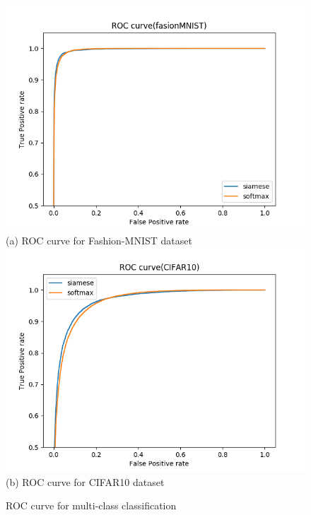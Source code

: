 \documentclass[a4paper,12pt]{article}
\begin{document}
\begin{figure}[ht!]
\centering
            \centering
            \includegraphics[scale=0.7]{fasion_multiroccurve.png}
           \\ (a) ROC curve for Fashion-MNIST dataset\\
            \centering
            \includegraphics[scale=0.7]{multiroc_curve.png}
            \\ (b) ROC curve for CIFAR10 dataset\\
\caption{ROC curve for multi-class classification}
\label{fig:roc-mul}
\end{figure}
\end{document}
